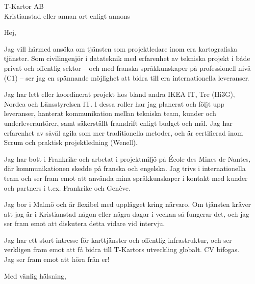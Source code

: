 \documentclass[a4paper,10pt]{letter}
\date{\today}
\begin{document}
\begin{letter}{T-Kartor AB\\[0.2cm]
Kristianstad eller annan ort enligt annons}

\opening{Hej,}

Jag vill härmed ansöka om tjänsten som projektledare inom era kartografiska tjänster. Som civilingenjör i datateknik med erfarenhet av tekniska projekt i både privat och offentlig sektor – och med franska språkkunskaper på professionell nivå (C1) – ser jag en spännande möjlighet att bidra till era internationella leveranser.

Jag har lett eller koordinerat projekt hos bland andra IKEA IT, Tre (Hi3G), Nordea och Länsstyrelsen IT. I dessa roller har jag planerat och följt upp leveranser, hanterat kommunikation mellan tekniska team, kunder och underleverantörer, samt säkerställt framdrift enligt budget och mål. Jag har erfarenhet av såväl agila som mer traditionella metoder, och är certifierad inom Scrum och praktisk projektledning (Wenell).

Jag har bott i Frankrike och arbetat i projektmiljö på École des Mines de Nantes, där kommunikationen skedde på franska och engelska. Jag trivs i internationella team och ser fram emot att använda mina språkkunskaper i kontakt med kunder och partners i t.ex. Frankrike och Genève.

Jag bor i Malmö och är flexibel med upplägget kring närvaro. Om tjänsten kräver att jag är i Kristianstad någon eller några dagar i veckan så fungerar det, och jag ser fram emot att diskutera detta vidare vid intervju.

Jag har ett stort intresse för karttjänster och offentlig infrastruktur, och ser verkligen fram emot att få bidra till T-Kartors utveckling globalt. CV bifogas. Jag ser fram emot att höra från er!

\closing{Med vänlig hälsning,}

\end{letter}
\end{document}
